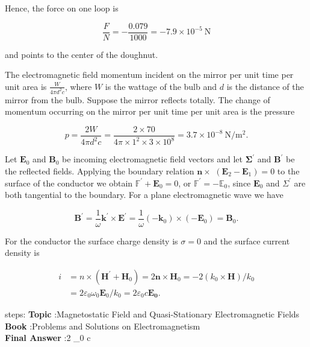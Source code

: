 \documentclass[10pt]{article}
\begin{document}
Hence, the force on one loop is

$$
\frac{F}{N}=-\frac{0.079}{1000}=-7.9 \times 10^{-5} \mathrm{~N}
$$

and points to the center of the doughnut.

 The electromagnetic field momentum incident on the mirror per unit time per unit area is $\frac{W}{4 \pi d^{2} c}$, where $W$ is the wattage of the bulb and $d$ is the distance of the mirror from the bulb. Suppose the mirror reflects totally. The change of momentum occurring on the mirror per unit time per unit area is the pressure

$$
p=\frac{2 W}{4 \pi d^{2} c}=\frac{2 \times 70}{4 \pi \times 1^{2} \times 3 \times 10^{8}}=3.7 \times 10^{-8} \mathrm{~N} / \mathrm{m}^{2} .
$$

 Let $\mathbf{E}_{0}$ and $\mathbf{B}_{0}$ be incoming electromagnetic field vectors and let $\mathbf{\Sigma}^{\prime}$ and $\boldsymbol{B}^{\prime}$ be the reflected fields. Applying the boundary relation $\mathbf{n} \times$ $\left(\mathbf{E}_{2}-\mathbf{E}_{1}\right)=0$ to the surface of the conductor we obtain $\mathbb{F}^{\prime}+\mathbf{E}_{0}=0$, or $\mathbb{F}^{\prime}=-\mathbb{E}_{0}$, since $\mathbf{E}_{0}$ and $\mathcal{\Sigma}^{\prime}$ are both tangential to the boundary. For a plane electromagnetic wave we have

$$
\mathbf{B}^{\prime}=\frac{1}{\omega} \mathbf{k}^{\prime} \times \mathbf{E}^{\prime}=\frac{1}{\omega}\left(-\mathbf{k}_{0}\right) \times\left(-\mathbf{E}_{0}\right)=\mathbf{B}_{0} .
$$

For the conductor the surface charge density is $\sigma=0$ and the surface current density is

$$
\begin{aligned}
i &=n \times\left(\mathbf{H}^{\prime}+\mathbf{H}_{0}\right)=2 \mathbf{n} \times \mathbf{H}_{0}=-2\left(k_{0} \times \mathbf{H}\right) / k_{0} \\
&=2 \varepsilon_{0} \omega_{0} \mathbf{E}_{0} / k_{0}=2 \varepsilon_{0} c \mathbf{\mathbf { E } _ { 0 }} .
\end{aligned}
$$

steps:
\textbf{Topic} :Magnetostatic Field and Quasi-Stationary Electromagnetic Fields\\
\textbf{Book} :Problems and Solutions on Electromagnetism\\
\textbf{Final Answer} :2 \varepsilon_{0} c \\
\end{document}
